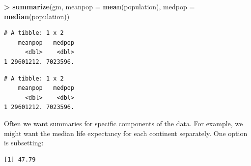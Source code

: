 \documentclass[]{krantz}
\makeatletter
\newenvironment{Shaded}{\begin{snugshade}}{\end{snugshade}}
\newcommand{\CommentTok}[1]{\textcolor[rgb]{0.37,0.37,0.37}{\textit{#1}}}
\newcommand{\DataTypeTok}[1]{\textcolor[rgb]{0.27,0.27,0.27}{#1}}
\newcommand{\ErrorTok}[1]{\textcolor[rgb]{0.14,0.14,0.14}{\textbf{#1}}}
\newcommand{\KeywordTok}[1]{\textcolor[rgb]{0.27,0.27,0.27}{\textbf{#1}}}
\newcommand{\NormalTok}[1]{#1}
\newcommand{\OperatorTok}[1]{\textcolor[rgb]{0.43,0.43,0.43}{\textbf{#1}}}
\newcommand{\StringTok}[1]{\textcolor[rgb]{0.5,0.5,0.5}{#1}}
\newenvironment{kframe}{%
\medskip{}
\setlength{\fboxsep}{.8em}
 \def\at@end@of@kframe{}%
 \ifinner\ifhmode%
  \def\at@end@of@kframe{\end{minipage}}%
  \begin{minipage}{\columnwidth}%
 \fi\fi%
 \def\FrameCommand##1{\hskip\@totalleftmargin \hskip-\fboxsep
 \colorbox{shadecolor}{##1}\hskip-\fboxsep
     \hskip-\linewidth \hskip-\@totalleftmargin \hskip\columnwidth}%
 \MakeFramed {\advance\hsize-\width
   \@totalleftmargin\z@ \linewidth\hsize
   \@setminipage}}%
 {\par\unskip\endMakeFramed%
 \at@end@of@kframe}
\renewenvironment{Shaded}{\begin{kframe}}{\end{kframe}}
\makeatother
\begin{document}
\begin{Shaded}
\begin{Highlighting}[]
\OperatorTok{>}\StringTok{ }\KeywordTok{summarize}\NormalTok{(gm, }\DataTypeTok{meanpop =} \KeywordTok{mean}\NormalTok{(population), }\DataTypeTok{medpop =} \KeywordTok{median}\NormalTok{(population))}
\end{Highlighting}
\end{Shaded}

\begin{verbatim}
# A tibble: 1 x 2
    meanpop   medpop
      <dbl>    <dbl>
1 29601212. 7023596.
\end{verbatim}

\begin{Shaded}
\end{Shaded}

\begin{verbatim}
# A tibble: 1 x 2
    meanpop   medpop
      <dbl>    <dbl>
1 29601212. 7023596.
\end{verbatim}

Often we want summaries for specific components of the data. For example, we might want the median life expectancy for each continent separately. One option is subsetting:

\begin{Shaded}
\end{Shaded}

\begin{verbatim}
[1] 47.79
\end{verbatim}

\begin{Shaded}
\end{Shaded}
\end{document}

